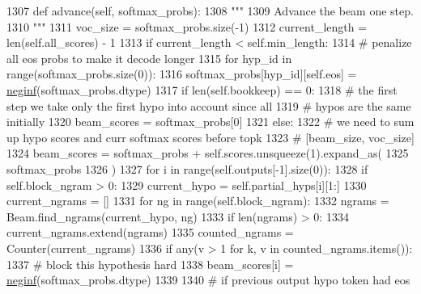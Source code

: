 \begin{DoxyCode}
1307     \textcolor{keyword}{def }advance(self, softmax\_probs):
1308         \textcolor{stringliteral}{"""}
1309 \textcolor{stringliteral}{        Advance the beam one step.}
1310 \textcolor{stringliteral}{        """}
1311         voc\_size = softmax\_probs.size(-1)
1312         current\_length = len(self.all\_scores) - 1
1313         \textcolor{keywordflow}{if} current\_length < self.min\_length:
1314             \textcolor{comment}{# penalize all eos probs to make it decode longer}
1315             \textcolor{keywordflow}{for} hyp\_id \textcolor{keywordflow}{in} range(softmax\_probs.size(0)):
1316                 softmax\_probs[hyp\_id][self.eos] = \hyperlink{namespaceparlai_1_1utils_1_1misc_a68c44ca571de7149b683539db659c330}{neginf}(softmax\_probs.dtype)
1317         \textcolor{keywordflow}{if} len(self.bookkeep) == 0:
1318             \textcolor{comment}{# the first step we take only the first hypo into account since all}
1319             \textcolor{comment}{# hypos are the same initially}
1320             beam\_scores = softmax\_probs[0]
1321         \textcolor{keywordflow}{else}:
1322             \textcolor{comment}{# we need to sum up hypo scores and curr softmax scores before topk}
1323             \textcolor{comment}{# [beam\_size, voc\_size]}
1324             beam\_scores = softmax\_probs + self.scores.unsqueeze(1).expand\_as(
1325                 softmax\_probs
1326             )
1327             \textcolor{keywordflow}{for} i \textcolor{keywordflow}{in} range(self.outputs[-1].size(0)):
1328                 \textcolor{keywordflow}{if} self.block\_ngram > 0:
1329                     current\_hypo = self.partial\_hyps[i][1:]
1330                     current\_ngrams = []
1331                     \textcolor{keywordflow}{for} ng \textcolor{keywordflow}{in} range(self.block\_ngram):
1332                         ngrams = Beam.find\_ngrams(current\_hypo, ng)
1333                         \textcolor{keywordflow}{if} len(ngrams) > 0:
1334                             current\_ngrams.extend(ngrams)
1335                     counted\_ngrams = Counter(current\_ngrams)
1336                     \textcolor{keywordflow}{if} any(v > 1 \textcolor{keywordflow}{for} k, v \textcolor{keywordflow}{in} counted\_ngrams.items()):
1337                         \textcolor{comment}{# block this hypothesis hard}
1338                         beam\_scores[i] = \hyperlink{namespaceparlai_1_1utils_1_1misc_a68c44ca571de7149b683539db659c330}{neginf}(softmax\_probs.dtype)
1339 
1340                 \textcolor{comment}{#  if previous output hypo token had eos}

\end{DoxyCode}
